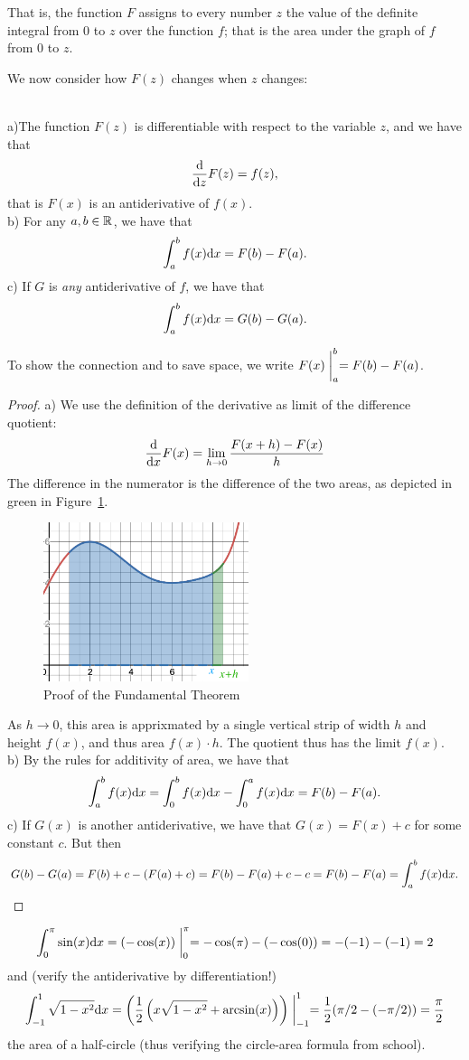 That is, the function $F$ assigns to every number $z$ the value of the definite
integral from $0$ to $z$ over the function $f$; that is the area under the graph
of $f$ from $0$ to $z$.

We now consider how $F(z)$ changes when $z$ changes:
\begin{thm}\ \\
a)The function $F(z)$ is differentiable with respect to the variable $z$, and we
have that
\[
\frac{{\mbox{d}}}{{\mbox{d}}z} F(z)=f(z),
\]
that is $F(x)$ is an antiderivative of $f(x)$.\\
b) For any $a,b\in{\mathbb R}$, we have that 
\[
\int_a^b f(x){\mbox{d}}x=F(b)-F(a).
\]
c) If $G$ is {\em any} antiderivative of $f$, we have that
\[
\int_a^b f(x){\mbox{d}}x=G(b)-G(a).
\]
\end{thm}
To show the connection and to save space, we write $\displaystyle
F(x)\biggm|_a^b=F(b)-F(a)$.
\begin{proof}
a) We use the definition of the derivative as limit of the difference quotient:
\[
\frac{{\mbox{d}}}{{\mbox{d}}x} F(x)=\lim_{h\to 0}\frac{F(x+h)-F(x)}{h}
\]
The difference in the numerator is the difference of the two areas, as depicted in
green in Figure~\ref{figfundthm}. 
\begin{figure}
\begin{center}
\includegraphics[width=6cm]{pic/fundthm.png}
\end{center}
\caption{Proof of the Fundamental Theorem}
\label{figfundthm}
\end{figure}
As $h\to 0$, this area is apprixmated by a single vertical strip of width $h$ and
height $f(x)$, and thus area $f(x)\cdot h$. The quotient thus has the limit
$f(x)$.\\
b) By the rules for additivity of area, we have that
\[
\int_a^b f(x){\mbox{d}}x=\int_0^b f(x){\mbox{d}}x-\int_0^a f(x){\mbox{d}}x=F(b)-F(a).
\]
c) If $G(x)$ is another antiderivative, we have that $G(x)=F(x)+c$ for some
constant $c$. But then
\[
G(b)-G(a)=F(b)+c-(F(a)+c)=F(b)-F(a)+c-c=F(b)-F(a)=\int_a^b f(x){\mbox{d}}x.
\]
\end{proof}
\begin{bsp}
\[
\int_0^\pi
\sin(x){\mbox{d}}x=(-\cos(x))\biggm|_0^\pi=-\cos(\pi)-(-\cos(0))=-(-1)-(-1)=2
\]
and (verify the antiderivative by differentiation!)
\[
\int_{-1}^1\sqrt{1-x^2}{\mbox{d}}x=\left(\frac12\left(x\sqrt{1-x^2}+\arcsin(x)\right)\right)
\biggm|_{-1}^1=\frac12(\pi/2-(-\pi/2))=\frac{\pi}{2}
\]
the area of a half-circle (thus verifying the circle-area formula from school).
\end{bsp}

